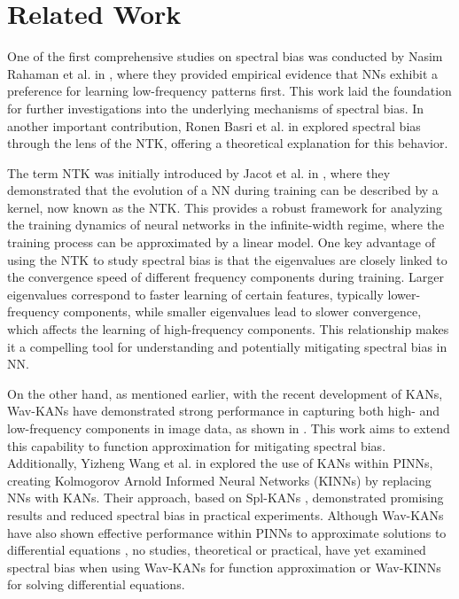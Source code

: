 \section{Related Work}
One of the first comprehensive studies on spectral bias was conducted by Nasim Rahaman et al. in \cite{rahaman2019spectralbiasneuralnetworks}, where they provided empirical evidence that NNs exhibit a preference for learning low-frequency patterns first. This work laid the foundation for further investigations into the underlying mechanisms of spectral bias. In another important contribution, Ronen Basri et al. in \cite{basri2020frequencybiasneuralnetworks} explored spectral bias through the lens of the NTK, offering a theoretical explanation for this behavior. 

The term NTK was initially introduced by Jacot et al. in \cite{NTKjacot2018}, where they demonstrated that the evolution of a NN during training can be described by a kernel, now known as the NTK. This provides a robust framework for analyzing the training dynamics of neural networks in the infinite-width regime, where the training process can be approximated by a linear model. One key advantage of using the NTK to study spectral bias is that the eigenvalues are closely linked to the convergence speed of different frequency components during training. Larger eigenvalues correspond to faster learning of certain features, typically lower-frequency components, while smaller eigenvalues lead to slower convergence, which affects the learning of high-frequency components. This relationship makes it a compelling tool for understanding and potentially mitigating spectral bias in NN.


On the other hand, as mentioned earlier, with the recent development of KANs, Wav-KANs have demonstrated strong performance in capturing both high- and low-frequency components in image data, as shown in \cite{bozorgasl2024wavkanwaveletkolmogorovarnoldnetworks}. This work aims to extend this capability to function approximation for mitigating spectral bias. Additionally, Yizheng Wang et al. in \cite{wang2024kolmogorovarnoldinformedneural} explored the use of KANs within PINNs, creating Kolmogorov Arnold Informed Neural Networks (KINNs) by replacing NNs with KANs. Their approach, based on Spl-KANs \cite{liu2024kankolmogorovarnoldnetworks}, demonstrated promising results and reduced spectral bias in practical experiments. Although Wav-KANs have also shown effective performance within PINNs to approximate solutions to differential equations \cite{patra2024physicsinformedkolmogorovarnoldneural}, no studies, theoretical or practical, have yet examined spectral bias when using Wav-KANs for function approximation or Wav-KINNs for solving differential equations.

